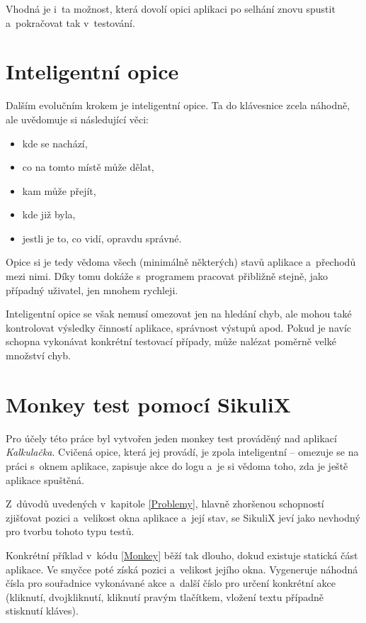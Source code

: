 	Vhodná je i~ta možnost, která dovolí opici aplikaci po selhání znovu spustit a~pokračovat tak v~testování.
	
	\section{Inteligentní opice}
	Dalším evolučním krokem je inteligentní opice. Ta do klávesnice  zcela náhodně, ale uvědomuje si následující věci:
		\begin{itemize}
			\item kde se nachází,
			\item co na tomto místě může dělat,
			\item kam může přejít,
			\item kde již byla,
			\item jestli je to, co vidí, opravdu správné.
		\end{itemize}
	Opice si je tedy vědoma všech (minimálně některých) stavů aplikace a~přechodů mezi nimi. Díky tomu dokáže s~programem pracovat přibližně stejně, jako případný uživatel, jen mnohem rychleji.
	
	Inteligentní opice se však nemusí omezovat jen na hledání chyb, ale mohou také kontrolovat výsledky činností aplikace, správnost výstupů apod. Pokud je navíc schopna vykonávat konkrétní testovací případy, může nalézat poměrně velké množství chyb.
	
	\section{Monkey test pomocí SikuliX}
	Pro účely této práce byl vytvořen jeden monkey test prováděný nad aplikací \emph{Kalkulačka}. Cvičená opice, která jej provádí, je zpola inteligentní -- omezuje se na práci s~oknem aplikace, zapisuje akce do logu a~je si vědoma toho, zda je ještě aplikace spuštěná.
	
	Z~důvodů uvedených v~kapitole \ref{Problemy}, hlavně zhoršenou schopností zjišťovat pozici a~velikost okna aplikace a~její stav, se SikuliX jeví jako nevhodný pro tvorbu tohoto typu testů.
	
	Konkrétní příklad v~kódu \ref{Monkey} běží tak dlouho, dokud existuje statická část aplikace. Ve smyčce poté získá pozici a~velikost jejího okna. Vygeneruje náhodná čísla pro souřadnice vykonávané akce a~další číslo pro určení konkrétní akce (kliknutí, dvojkliknutí, kliknutí pravým tlačítkem, vložení textu případně stisknutí kláves). 
	
	